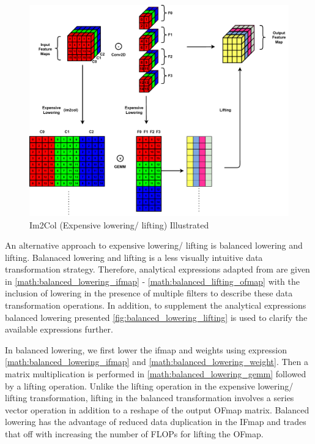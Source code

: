 \begin{figure}[ht]
    \centering
    \includegraphics[scale=0.6]{fig/Im2Col.pdf}
    \caption{Im2Col (Expensive lowering/ lifting) Illustrated}
    \label{fig:im2col}
\end{figure}

An alternative approach to expensive lowering/ lifting is balanced lowering and
lifting. Balanaced lowering and lifting is a less visually intuitive data
transformation strategy. Therefore, analytical expressions adapted from
\cite{cafe_con_troll} are given in \eqref{math:balanced_lowering_ifmap} -
\eqref{math:balanced_lifting_ofmap} with the inclusion of lowering in
the presence of multiple filters to describe these data transformation
operations. In addition, to supplement the analytical expressions balanced
lowering presented \autoref{fig:balanced_lowering_lifting} is used to clarify
the available expressions further.  

In balanced lowering, we first lower the ifmap and weights using expression
\eqref{math:balanced_lowering_ifmap} and \eqref{math:balanced_lowering_weight}.
Then a matrix multiplication is performed in \eqref{math:balanced_lowering_gemm}
followed by a lifting operation. Unlike the lifting operation in the expensive
lowering/ lifting transformation, lifting in the balanced transformation
involves a series vector operation in addition to a reshape of the output OFmap
matrix. Balanced lowering has the advantage of reduced data duplication in the
IFmap and trades that off with increasing the number of FLOPs for lifting the
OFmap. 
 

